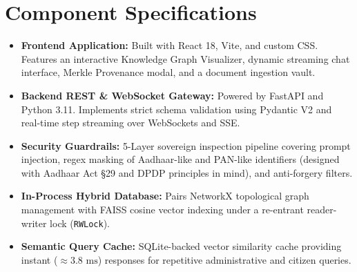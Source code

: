 \documentclass[12pt,a4paper,oneside]{report}
\begin{document}
\section{Component Specifications}
\begin{itemize}[itemsep=3pt]
    \item \textbf{Frontend Application:} Built with React 18, Vite, and custom CSS. Features an interactive Knowledge Graph Visualizer, dynamic streaming chat interface, Merkle Provenance modal, and a document ingestion vault.
    \item \textbf{Backend REST \& WebSocket Gateway:} Powered by FastAPI and Python 3.11. Implements strict schema validation using Pydantic V2 and real-time step streaming over WebSockets and SSE.
    \item \textbf{Security Guardrails:} 5-Layer sovereign inspection pipeline covering prompt injection, regex masking of Aadhaar-like and PAN-like identifiers (designed with Aadhaar Act §29 and DPDP principles in mind), and anti-forgery filters.
    \item \textbf{In-Process Hybrid Database:} Pairs NetworkX topological graph management with FAISS cosine vector indexing under a re-entrant reader-writer lock (\texttt{RWLock}).
    \item \textbf{Semantic Query Cache:} SQLite-backed vector similarity cache providing instant ($\approx 3.8\text{ ms}$) responses for repetitive administrative and citizen queries.
\end{itemize}
\end{document}

